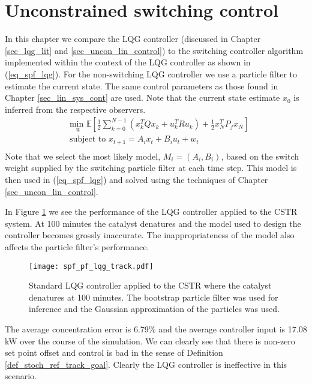\section{Unconstrained switching control}
\label{sec_spf_uncon}
In this chapter we compare the LQG controller (discussed in Chapter \ref{sec_lqg_lit} and \ref{sec_uncon_lin_control}) to the switching controller algorithm implemented within the context of the LQG controller as shown in (\ref{eq_spf_lqg}). For the non-switching LQG controller we use a particle filter to estimate the current state. The same control parameters as those found in Chapter \ref{sec_lin_sys_cont} are used. Note that the current state estimate $x_0$ is inferred from the respective observers.
\begin{equation}
\begin{aligned}
&\underset{\mathbf{u}}{\text{min }} \mathbb{E}\left[ \frac{1}{2}\sum_{k=0}^{N-1} \left( x_k^TQx_k + u_k^TRu_k \right) + \frac{1}{2}x_N^TP_fx_N \right] \\
& \text{subject to } x_{t+1}=A_ix_t+B_iu_t + w_t \\
\end{aligned}
\label{eq_spf_lqg}
\end{equation}
Note that we select the most likely model, $M_i=(A_i, B_i)$, based on the switch weight supplied by the switching particle filter at each time step. This model is then used in (\ref{eq_spf_lqg}) and solved using the techniques of Chapter \ref{sec_uncon_lin_control}.
 
In Figure \ref{fig_spf_pf_lqg_track} we see the performance of the LQG controller applied to the CSTR system. At 100 minutes the catalyst denatures and the model used to design the controller becomes grossly inaccurate. The inappropriateness of the model also affects the particle filter's performance. 
\begin{figure}[H] 
\centering
\texttt{[image: spf\_pf\_lqg\_track.pdf]}
\caption{Standard LQG controller applied to the CSTR where the catalyst denatures at 100 minutes. The bootstrap particle filter was used for inference and the Gaussian approximation of the particles was used.}
\label{fig_spf_pf_lqg_track}
\end{figure}
The average concentration error is 6.79\% and the average controller input is 17.08 kW over the course of the simulation. We can clearly see that there is non-zero set point offset and control is bad in the sense of Definition \ref{def_stoch_ref_track_goal}. Clearly the LQG controller is ineffective in this scenario.

